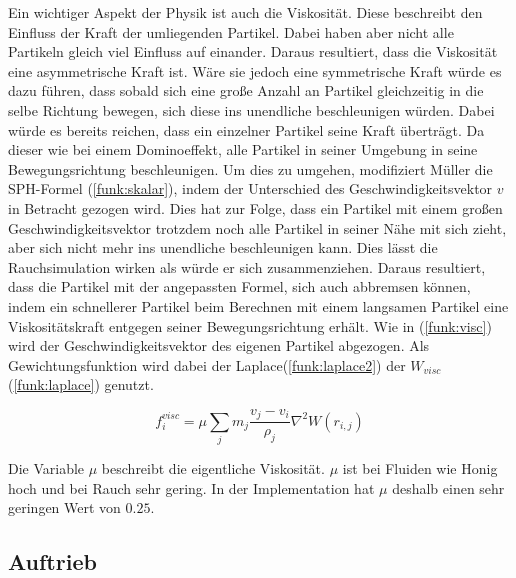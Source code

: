 \documentclass[intern,palatino]{cgBA}
\begin{document}
Ein wichtiger Aspekt der Physik ist auch die Viskosität. Diese beschreibt den Einfluss der Kraft der umliegenden Partikel. Dabei haben aber nicht alle Partikeln gleich viel Einfluss auf einander. Daraus resultiert, dass die Viskosität eine asymmetrische Kraft ist. Wäre sie jedoch eine symmetrische Kraft würde es dazu führen, dass sobald sich eine große Anzahl an Partikel gleichzeitig in die selbe Richtung bewegen, sich diese ins unendliche beschleunigen würden. Dabei würde es bereits reichen, dass ein einzelner Partikel seine Kraft überträgt. Da dieser wie bei einem Dominoeffekt, alle Partikel in seiner Umgebung in seine Bewegungsrichtung beschleunigen. Um dies zu umgehen, modifiziert Müller \cite{muller2003particle} die SPH-Formel (\ref{funk:skalar}), indem der Unterschied des Geschwindigkeitsvektor $v$ in Betracht gezogen wird. Dies hat zur Folge, dass ein Partikel mit einem großen Geschwindigkeitsvektor trotzdem noch alle Partikel in seiner Nähe mit sich zieht, aber sich nicht mehr ins unendliche beschleunigen kann.
\newline
Dies lässt die Rauchsimulation wirken als würde er sich zusammenziehen. Daraus resultiert, dass die Partikel mit der angepassten Formel, sich auch abbremsen können, indem ein schnellerer Partikel beim Berechnen mit einem langsamen Partikel eine Viskositätskraft entgegen seiner Bewegungsrichtung erhält. 
\newline
Wie in (\ref{funk:visc}) wird der Geschwindigkeitsvektor des eigenen Partikel abgezogen. Als Gewichtungsfunktion wird dabei der Laplace(\ref{funk:laplace2}) der $W_{visc}$(\ref{funk:laplace}) genutzt.

\begin{equation}\label{funk:visc}
f^{visc}_i  = \mu \sum_j m_j \frac{v_j-v_i}{\rho_j} \nabla^2 W(r_{i,j})
\end{equation}

Die Variable $\mu$ beschreibt die eigentliche Viskosität. $\mu$ ist bei Fluiden wie Honig hoch und bei Rauch sehr gering. In der Implementation hat $\mu$ deshalb einen sehr geringen Wert von $0.25$.


\subsection{Auftrieb}\label{auftrieb}
\end{document}
